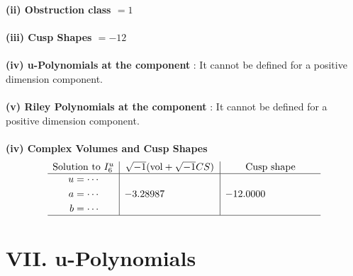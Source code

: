 \documentclass[1p]{elsarticle_modified}
\theoremstyle{definition}
\newcommand{\I}{\sqrt{-1}}
\begin{document}
\flushleft \textbf{(ii) Obstruction class $= 1$}\\~\\
\flushleft \textbf{(iii) Cusp Shapes $= -12$}\\~\\
\flushleft \textbf{(iv) u-Polynomials at the component} : It cannot be defined for a positive dimension component.\\~\\
\flushleft \textbf{(v) Riley Polynomials at the component} : It cannot be defined for a positive dimension component.\\~\\
\newpage\flushleft \textbf{(iv) Complex Volumes and Cusp Shapes}
$$\begin{array}{c|c|c} 
\text{Solution to }I^u_{6}& \I (\text{vol} + \sqrt{-1}CS) & \text{Cusp shape}\\
 \hline 
\begin{aligned}
u &= \cdots \\
a &= \cdots \\
b &= \cdots\end{aligned}
 & -3.28987\phantom{ +0.000000I} & -12.0000\phantom{ +0.000000I}\\
 \hline 
 \end{array}
$$
\newpage\renewcommand{\arraystretch}{1}
\centering \section*{ VII. u-Polynomials}
\end{document}
